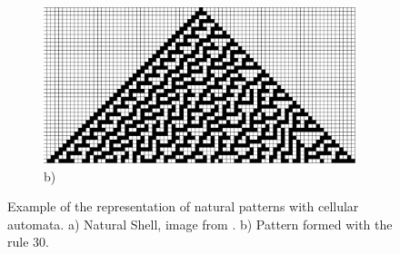 \begin{figure}
        \begin{subfigure}[b]{0.9\textwidth}
                \includegraphics[width=\textwidth]{img/Theory/Cellular_A/Rule30.png}
				\caption{b)}
				\label{fig:CArule30}
        \end{subfigure}
        \caption{Example of the representation of natural patterns with cellular automata. a) Natural Shell, image from \cite{Shiffman2012}. b) Pattern formed with the rule 30.}
		\label{fig:CArule30shell}
\end{figure}


